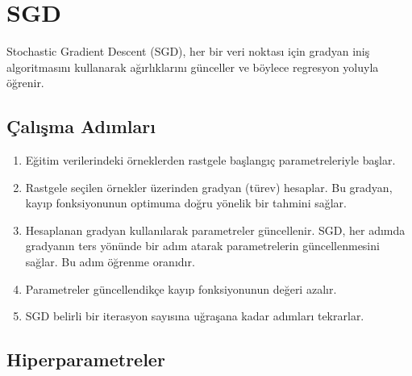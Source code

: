 \section{SGD}
Stochastic Gradient Descent (SGD), her bir veri noktası için gradyan iniş algoritmasını kullanarak ağırlıklarını günceller ve böylece regresyon yoluyla öğrenir.

\subsection{Çalışma Adımları}
\begin{enumerate}
    \item Eğitim verilerindeki örneklerden rastgele başlangıç parametreleriyle başlar.
    \item Rastgele seçilen örnekler üzerinden gradyan (türev) hesaplar. Bu gradyan, kayıp fonksiyonunun optimuma doğru yönelik bir tahmini sağlar.
    \item Hesaplanan gradyan kullanılarak parametreler güncellenir. SGD, her adımda gradyanın ters yönünde bir adım atarak parametrelerin güncellenmesini sağlar. Bu adım öğrenme oranıdır.
    \item Parametreler güncellendikçe kayıp fonksiyonunun değeri azalır.
    \item SGD belirli bir iterasyon sayısına uğraşana kadar adımları tekrarlar.
\end{enumerate}

\subsection{Hiperparametreler}
\begin{table}[h]
\centering
{\scriptsize\renewcommand{\arraystretch}{0.4}
{}}
\end{table}

\newpage
